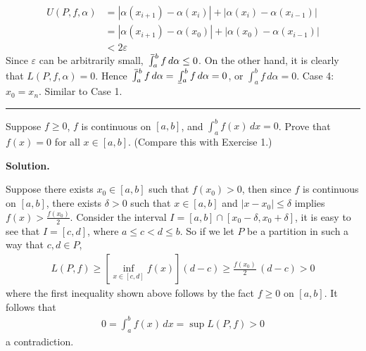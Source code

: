 \documentclass[12pt]{article}
\theoremstyle{definition}
\begin{document}
\begin{align*}
U(P,f,\alpha)
&=\left\vert\alpha(x_{i+1})-\alpha(x_i)\right\vert
+\left\vert\alpha(x_i)-\alpha(x_{i-1})\right\vert \\
&=\left\vert\alpha(x_{i+1})-\alpha(x_0)\right\vert
+\left\vert\alpha(x_0)-\alpha(x_{i-1})\right\vert \\
&<2\varepsilon
\end{align*}
Since $\varepsilon$ can be arbitrarily small, $\mathchoice%
    {\mkern13mu\overline{\vphantom{\intop}\mkern7mu}\mkern-20mu}%
    {\mkern7mu\overline{\vphantom{\intop}\mkern7mu}\mkern-14mu}%
    {\mkern7mu\overline{\vphantom{\intop}\mkern7mu}\mkern-14mu}%
    {\mkern7mu\overline{\vphantom{\intop}\mkern7mu}\mkern-14mu}%
  \int_a^bf\,d\alpha\le 0$. On the other hand, it is clearly that $L(P,f,\alpha)=0$. Hence $\mathchoice%
    {\mkern13mu\overline{\vphantom{\intop}\mkern7mu}\mkern-20mu}%
    {\mkern7mu\overline{\vphantom{\intop}\mkern7mu}\mkern-14mu}%
    {\mkern7mu\overline{\vphantom{\intop}\mkern7mu}\mkern-14mu}%
    {\mkern7mu\overline{\vphantom{\intop}\mkern7mu}\mkern-14mu}%
  \int_a^bf\,d\alpha=\mkern3mu\underline{\vphantom{\intop}\mkern7mu}\mkern-10mu\int_a^b f\,d\alpha=0$, or $\int_a^bf\,d\alpha=0$.
Case 4: $x_0=x_n$. Similar to Case 1.



\bigskip\noindent\hrule\bigskip

Suppose $f\ge 0$, $f$ is continuous on $[a,b]$, and $\int_a^bf(x)\,dx=0$. Prove that $f(x)=0$ for all $x\in[a,b]$. (Compare this with Exercise 1.)

\smallskip
\noindent\textbf{Solution.}\quad

Suppose there exists $x_0\in[a,b]$ such that $f(x_0)>0$, then since $f$ is continuous on $[a,b]$, there exists $\delta>0$ such that $x\in[a,b]$ and $\left\vert x-x_0\right\vert\le\delta$ implies $f(x)>\frac{f(x_0)}{2}$. Consider the interval $I=[a,b]\cap[x_0-\delta,x_0+\delta]$, it is easy to see that $I=[c,d]$, where $a\le c<d\le b$. So if we let $P$ be a partition in such a way that $c,d\in P$,
\begin{align*}
L(P,f)\ge\left[\inf_{x\in[c,d]}f(x)\right](d-c)\ge\frac{f(x_0)}{2}\,(d-c)>0
\end{align*}
where the first inequality shown above follows by the fact $f\ge 0$ on $[a,b]$. It follows that
\begin{align*}
0=\int_a^bf(x)\,dx=\sup L(P,f)>0
\end{align*}
a contradiction.
\end{document}

